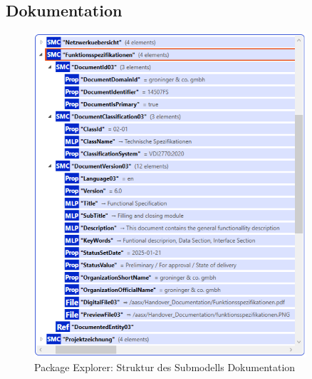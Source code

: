 \subsection{Dokumentation}
\begin{figure}[H]
    \centering
        \includegraphics[width=0.9\textwidth]{Bilder/ErgebnissePackageExplorer/SMCDokumentation.PNG}
    \caption{Package Explorer: Struktur des Submodells Dokumentation}
    \label{fig:SMDokumentation}
\end{figure}
\newpage
